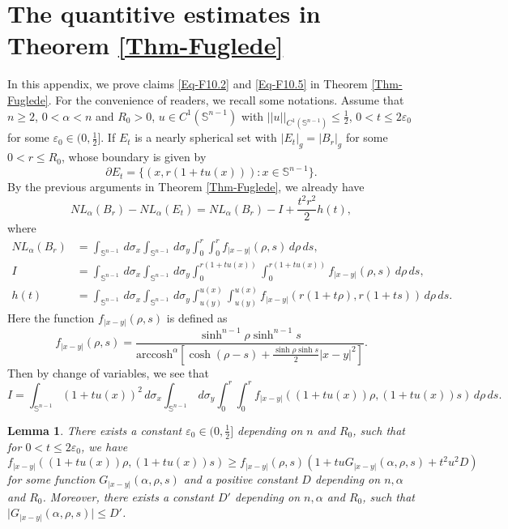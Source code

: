 \documentclass[11pt,reqno]{amsart}
\newtheorem{lem}[thm]{Lemma}
\theoremstyle{definition}
\theoremstyle{remark}
\numberwithin{equation}{section}
\renewcommand{\(}{\left(}
\renewcommand{\)}{\right)}
\renewcommand{\-}{\overline}
\begin{document}
\appendix
\section{The quantitive estimates in Theorem \ref{Thm-Fuglede}}
In this appendix, we prove claims \eqref{Eq-F10.2} and \eqref{Eq-F10.5} in Theorem \ref{Thm-Fuglede}. For the convenience of readers, we recall some notations. Assume that $n\geq 2$, $0<\alpha<n$ and $R_0>0$, $u\in C^1(\mathbb{S}^{n-1})$ with $||u||_{C^1(\mathbb{S}^{n-1})}\leq\frac{1}{2}$, $0<t\leq 2\varepsilon_0$ for some $\varepsilon_0\in(0,\frac{1}{2}]$. If $E_t$ is a nearly spherical set with $|E_t|_g=|B_r|_g$ for some $0<r\leq R_0$, whose boundary is given by 
	\begin{equation*}
	\partial E_t=\{(x,r(1+tu(x))):x\in\mathbb{S}^{n-1}\}.
\end{equation*}
By the previous arguments in Theorem \ref{Thm-Fuglede}, we already have
\begin{equation}\label{Eq-a0}
	NL_{\alpha}(B_r)-NL_{\alpha}(E_t)=NL_{\alpha}(B_r)-I+\frac{t^2 r^2}{2}h(t),
\end{equation}
where
\begin{align}
	NL_{\alpha}(B_r)&=\int_{\mathbb{S}^{n-1}}\,d\sigma_x\int_{\mathbb{S}^{n-1}}\,d\sigma_y\int_0^{r}\int_0^{r}{f_{|x-y|}(\rho,s)}\,d\rho\,ds,\label{Eq-a1}\\
	I&=\int_{\mathbb{S}^{n-1}}\,d\sigma_x\int_{\mathbb{S}^{n-1}}\,d\sigma_y\int_0^{r(1+tu(x))}\int_0^{r(1+tu(x))}{f_{|x-y|}(\rho,s)}\,d\rho\,ds,\label{Eq-a2}\\
	h(t)&=\int_{\mathbb{S}^{n-1}}\,d\sigma_x\int_{\mathbb{S}^{n-1}}\,d\sigma_y\int_{u(y)}^{u(x)}\int_{u(y)}^{u(x)}{f_{|x-y|}(r(1+t\rho),r(1+ts))}\,d\rho\,ds.\label{Eq-a3}
\end{align}
Here the function $f_{|x-y|}(\rho,s)$ is defined as 
\begin{equation*}
		f_{|x-y|}(\rho,s)=\frac{\sinh^{n-1}\rho\sinh^{n-1}s}{\mathrm{arccosh}^{\alpha}\left[\cosh(\rho-s)+\frac{\sinh\rho\sinh s}{2}{|x-y|}^2\right]}.
\end{equation*}
Then by change of variables, we see that
\begin{equation}\label{Eq-a4}
	I=\int_{\mathbb{S}^{n-1}}(1+tu(x))^2\,d\sigma_x\int_{\mathbb{S}^{n-1}}\,d\sigma_y\int_0^{r}\int_0^{r}{f_{|x-y|}\left((1+tu(x))\rho,(1+tu(x))s\right)}\,d\rho\,ds.
\end{equation}
\begin{lem}\label{Lem-appen--1}
	There exists a constant $\varepsilon_0\in(0,\frac{1}{2}]$ depending on $n$ and $R_0$, such that for $0<t\leq 2\varepsilon_0$,  we have
	\begin{equation}\label{Eq-a5}
	f_{|x-y|}\left((1+tu(x))\rho,(1+tu(x))s\right)\geq f_{|x-y|}(\rho,s)\left(1+tuG_{|x-y|}(\alpha,\rho,s)+t^2u^2D\right)
	\end{equation}
	for some function $G_{|x-y|}(\alpha,\rho,s)$ and a positive constant $D$ depending on $n,\alpha$ and $R_0$. Moreover, there exists a constant $D'$ depending on $n,\alpha$ and $R_0$, such that $\big|G_{|x-y|}(\alpha,\rho,s)\big|\leq D'$.
\end{lem}
\end{document}
